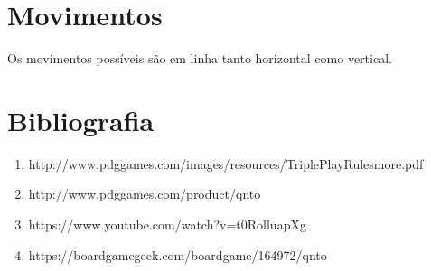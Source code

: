 \documentclass[a4paper]{article}
\begin{document}
\section{Movimentos}

Os movimentos possíveis são em linha tanto horizontal como vertical. 

\section{Bibliografia}

\begin{enumerate}
	\item http://www.pdggames.com/images/resources/TriplePlayRulesmore.pdf
	\item http://www.pdggames.com/product/qnto
	\item https://www.youtube.com/watch?v=t0RolluapXg
	\item https://boardgamegeek.com/boardgame/164972/qnto
\end{enumerate}
\end{document}
